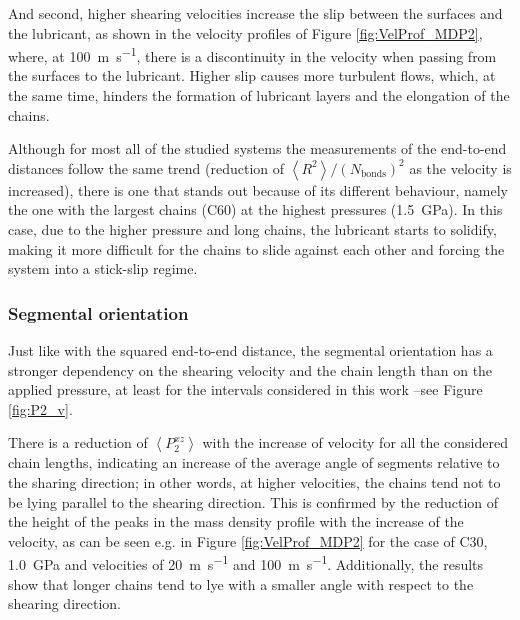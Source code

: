 \documentclass[aps,prb,reprint,superscriptaddress, a4paper]{revtex4-1}
\begin{document}
And second, higher shearing velocities increase the slip between the surfaces and the lubricant, as shown in the velocity profiles of Figure \ref{fig:VelProf_MDP2}, where, at \SI{100}{\meter\per\second}, there is a discontinuity in the velocity when passing from the surfaces to the lubricant. Higher slip causes more turbulent flows, which, at the same time, hinders the formation of lubricant layers and the elongation of the chains.

Although for most all of the studied systems the measurements of the end-to-end distances follow the same trend (reduction of  $\left< R^2 \right>/\left(N_\text{bonds}\right)^2$ as the velocity is increased), there is one that stands out because of its different behaviour, namely the one with the largest chains (C60) at the highest pressures (\SI{1.5}{\giga\pascal}). In this case, due to the higher pressure and long chains, the lubricant starts to solidify, making it more difficult for the chains to slide against each other and forcing the system into a stick-slip regime.  

\subsubsection{Segmental orientation}

Just like with the squared end-to-end distance,  the segmental orientation has a stronger dependency on the shearing velocity and the chain length than on the applied pressure, at least for the intervals considered in this work --see Figure \ref{fig:P2_v}. 

There is a reduction of  $\left<P_{2}^{xz} \right> $ with the increase of velocity for all the considered chain lengths, indicating an increase of the average  angle of segments relative  to the sharing direction; in other words, at higher velocities, the chains tend not to be lying parallel to the shearing direction. This is confirmed by the reduction of the height of the peaks in the  mass density profile with the increase of the velocity, as can be seen e.g.  in Figure  \ref{fig:VelProf_MDP2} for the case of C30, \SI{1.0}{\giga\pascal} and velocities of  \SI{20}{\meter\per\second} and  \SI{100}{\meter\per\second}. Additionally, the results show that longer chains tend to  lye  with a smaller angle with respect to the shearing direction.
\end{document}
